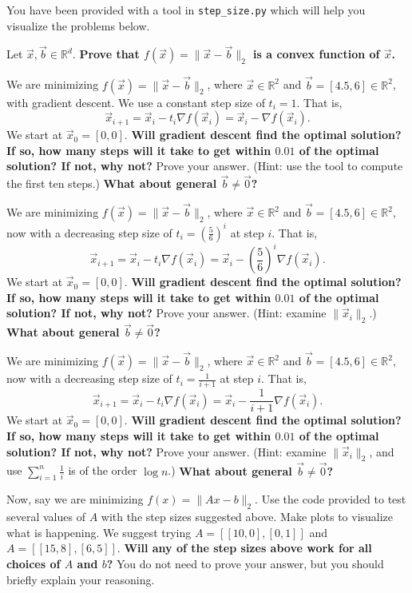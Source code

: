 \documentclass[preview]{standalone}
\begin{document}
You have been provided with a tool in \texttt{step\_size.py} which will help you
visualize the problems below.

\begin{Parts}

\Part Let $\vec{x}, \vec{b} \in \mathbb{R}^d$.
{\bf Prove that $f(\vec{x}) = \|\vec{x}-\vec{b}\|_2$ is a convex function of $\vec{x}$.}




\Part We are minimizing $f(\vec{x}) = \|\vec{x}-\vec{b}\|_2$,
where $\vec{x} \in \mathbb{R}^2$ and $\vec{b} = [4.5, 6] \in \mathbb{R}^2$,
with gradient descent. We use a constant step size of $t_i = 1$. That is,
$$\vec{x}_{i+1} = \vec{x}_i - t_i \nabla f(\vec{x}_i) = \vec{x}_i - \nabla f(\vec{x}_i).$$
We start at $\vec{x}_0 = [0, 0].$
\textbf{Will gradient descent find the optimal solution?
If so, how many steps will it take to get within $0.01$ of the optimal solution? If not, why not?}
Prove your answer. (Hint: use the tool to compute the first ten steps.)
\textbf{What about general $\vec{b} \neq \vec{0}$?}




\Part We are minimizing $f(\vec{x}) = \|\vec{x}-\vec{b}\|_2$,
where $\vec{x} \in \mathbb{R}^2$ and $\vec{b} = [4.5, 6] \in \mathbb{R}^2$,
now with a decreasing step size of $t_i = (\frac{5}{6})^i$ at step $i$. That is,
$$\vec{x}_{i+1} = \vec{x}_i - t_i \nabla f(\vec{x}_i) =
\vec{x}_i - (\frac{5}{6})^i \nabla f(\vec{x}_i).$$
We start at $\vec{x}_0 = [0, 0].$
\textbf{Will gradient descent find the optimal solution?
If so, how many steps will it take to get within $0.01$ of the optimal solution?
If not, why not?} Prove your answer. (Hint: examine $\|\vec{x}_i\|_2$.)
\textbf{What about general $\vec{b} \neq \vec{0}$?}




\Part We are minimizing $f(\vec{x}) = \|\vec{x}-\vec{b}\|_2$,
where $\vec{x} \in \mathbb{R}^2$ and $\vec{b} = [4.5, 6] \in \mathbb{R}^2$,
now with a decreasing step size of $t_i = \frac{1}{i+1}$ at step $i$. That is,
$$\vec{x}_{i+1} = \vec{x}_i - t_i \nabla f(\vec{x}_i)
= \vec{x}_i - \frac{1}{i+1} \nabla f(\vec{x}_i).$$
We start at $\vec{x}_0 = [0, 0].$
\textbf{Will gradient descent find the optimal solution?
If so, how many steps will it take to get within $0.01$ of the optimal solution?
If not, why not?}
Prove your answer. (Hint: examine $\|\vec{x}_i\|_2$,
and use $\sum_{i=1}^n \frac 1 i$ is of the order $\log n$.)
\textbf{What about general $\vec{b} \neq \vec{0}$?}




\Part Now, say we are minimizing $f(x) = \|Ax-b\|_2$. Use the code provided to test several values of $A$ with the step sizes suggested above. Make plots to visualize what is happening. We suggest trying $A = [[10, 0], [0, 1]]$ and $A = [[15, 8], [6, 5]]$. \textbf{Will any of the step sizes above work for all choices of $A$ and $b$?} You do not need to prove your answer, but you should briefly explain your reasoning.



\end{Parts}
\end{document}
